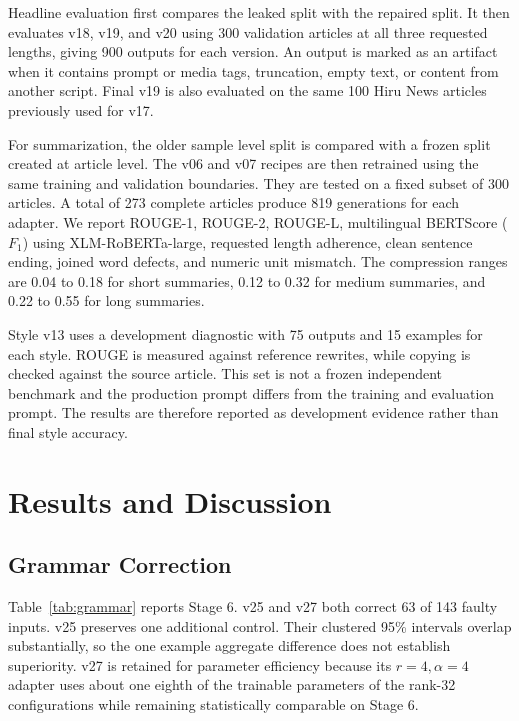 \documentclass[a4paper,conference]{IEEEtran}
\begin{document}
Headline evaluation first compares the leaked split with the repaired split.
It then evaluates v18, v19, and v20 using 300 validation articles at all three
requested lengths, giving 900 outputs for each version. An output is marked as
an artifact when it contains prompt or media tags, truncation, empty text, or
content from another script. Final v19 is also evaluated on the same 100 Hiru
News articles previously used for v17.

For summarization, the older sample level split is compared with a frozen split
created at article level. The v06 and v07 recipes are then retrained using the
same training and validation boundaries. They are tested on a fixed subset of
300 articles. A total of 273 complete articles produce 819 generations for each
adapter. We report ROUGE-1, ROUGE-2, ROUGE-L, multilingual BERTScore ($F_1$)
\cite{zhang2019bertscore} using XLM-RoBERTa-large, requested length adherence,
clean sentence ending, joined word defects, and numeric unit mismatch. The
compression ranges are 0.04 to 0.18 for short summaries, 0.12 to 0.32 for
medium summaries, and 0.22 to 0.55 for long summaries.

Style v13 uses a development diagnostic with 75 outputs and 15 examples for
each style. ROUGE is measured against reference rewrites, while copying is
checked against the source article. This set is not a frozen independent
benchmark and the production prompt differs from the training and evaluation
prompt. The results are therefore reported as development evidence rather than
final style accuracy.

\section{Results and Discussion}
\subsection{Grammar Correction}
Table~\ref{tab:grammar} reports Stage 6. v25 and v27 both correct 63 of 143
faulty inputs. v25 preserves one additional control. Their clustered 95\%
intervals overlap substantially, so the one example aggregate difference does
not establish superiority. v27 is retained for parameter efficiency because its
$r=4,\alpha=4$ adapter uses about one eighth of the trainable parameters of the
rank-32 configurations while remaining statistically comparable on Stage 6.
\end{document}
